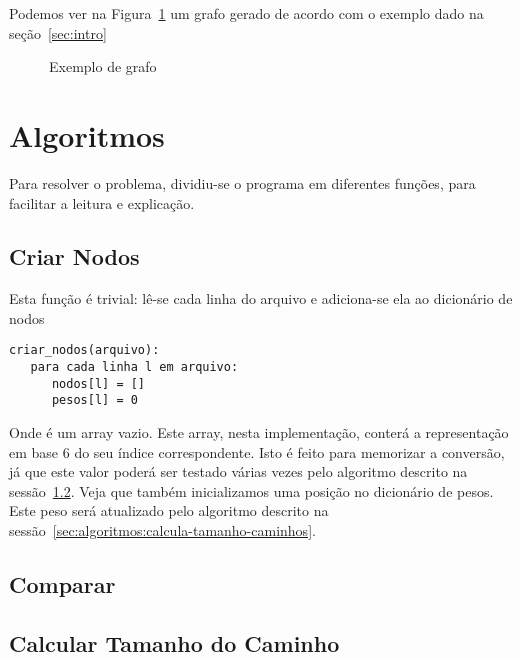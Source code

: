 \documentclass[12pt]{article}
\begin{document}

Podemos ver na Figura~\ref{fig:testeprof} um grafo gerado de acordo com o exemplo dado na se\c{c}ão~\ref{sec:intro}

\begin{figure}[h!]
    \begin{dot2tex}[neato,options=-tmath]
        
    \end{dot2tex}
    \caption{Exemplo de grafo}
    \label{fig:testeprof}
\end{figure}


\section{Algoritmos}\label{sec:algoritmos}
Para resolver o problema, dividiu-se o programa em diferentes fun\c{c}ões, para facilitar a leitura e explica\c{c}ão.

\subsection{Criar Nodos}\label{sec:algoritmos:criar-nodos}
Esta fun\c{c}ão é trivial: lê-se cada linha do arquivo e adiciona-se ela ao dicionário de nodos
\begin{lstlisting}
criar_nodos(arquivo):
   para cada linha l em arquivo:
      nodos[l] = []
      pesos[l] = 0
\end{lstlisting}

Onde {\sf []} é um \textsf{array} vazio. Este array, nesta implementa\c{c}ão, conterá a representa\c{c}ão em base 6 do seu índice correspondente. Isto é feito para memorizar a conversão, já que este valor poderá ser testado várias vezes pelo algoritmo descrito na sessão~\ref{sec:algoritmos:compara}.
Veja que também inicializamos uma posi\c{c}ão no dicionário de pesos. Este peso será atualizado pelo algoritmo descrito na sessão~\ref{sec:algoritmos:calcula-tamanho-caminhos}.

\subsection{Comparar}\label{sec:algoritmos:compara}

\subsection{Calcular Tamanho do Caminho}\label{sec:algoritmos:calcula-tamanho-caminho}
\end{document}
